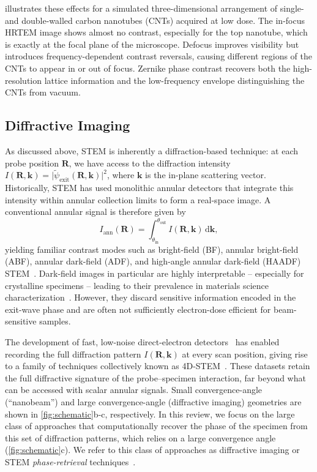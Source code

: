 \documentclass[pdflatex,sn-aps,iicol]{sn-jnl}%
\begin{document}
 illustrates these effects for a simulated three-dimensional arrangement of single- and double-walled carbon nanotubes (CNTs) acquired at low dose.
The in-focus HRTEM image shows almost no contrast, especially for the top nanotube, which is exactly at the focal plane of the microscope.
Defocus improves visibility but introduces frequency-dependent contrast reversals, causing different regions of the CNTs to appear in or out of focus.
Zernike phase contrast recovers both the high-resolution lattice information and the low-frequency envelope distinguishing the CNTs from vacuum.

\subsection{Diffractive Imaging}

As discussed above, STEM is inherently a diffraction-based technique: at each probe position $\boldsymbol{R}$, we have access to the diffraction intensity $I(\boldsymbol{R},\boldsymbol{k}) = \lvert \tilde{\psi}_{\text{exit}}(\boldsymbol{R},\boldsymbol{k}) \rvert^2$, where $\boldsymbol{k}$ is the in-plane scattering vector.
Historically, STEM has used monolithic annular detectors that integrate this intensity within annular collection limits to form a real-space image.
A conventional annular signal is therefore given by
\begin{equation}
  I_{\text{ann}}(\boldsymbol{R}) = \int_{\theta_{\text{in}}}^{\theta_{\text{out}}} I(\boldsymbol{R},\boldsymbol{k})\,\mathrm{d}\boldsymbol{k},
  \label{eq:annular-int}
\end{equation}
yielding familiar contrast modes such as bright-field (BF), annular bright-field (ABF), annular dark-field (ADF), and high-angle annular dark-field (HAADF) STEM~\cite{Crewe_1970,Pennycook_1991}.
Dark-field images in particular are highly interpretable -- especially for crystalline specimens -- leading to their prevalence in materials science characterization~\cite{Ophus_2023}.
However, they discard sensitive information encoded in the exit-wave phase and are often not sufficiently electron-dose efficient for beam-sensitive samples.

The development of fast, low-noise direct-electron detectors~\cite{Levin_2021} has enabled recording the full diffraction pattern $I(\boldsymbol{R},\boldsymbol{k})$ at every scan position, giving rise to a family of techniques collectively known as 4D-STEM~\cite{Ophus_2019}.
These datasets retain the full diffractive signature of the probe–specimen interaction, far beyond what can be accessed with scalar annular signals.
Small convergence-angle (``nanobeam'') and large convergence-angle (diffractive imaging) geometries are shown in \cref{fig:schematic}b-c, respectively.
In this review, we focus on the large class of approaches that computationally recover the phase of the specimen from this set of diffraction patterns, which relies on a large convergence angle (\cref{fig:schematic}c).
We refer to this class of approaches as diffractive imaging or STEM \emph{phase-retrieval} techniques~\cite{sanchez2025}.
\end{document}
